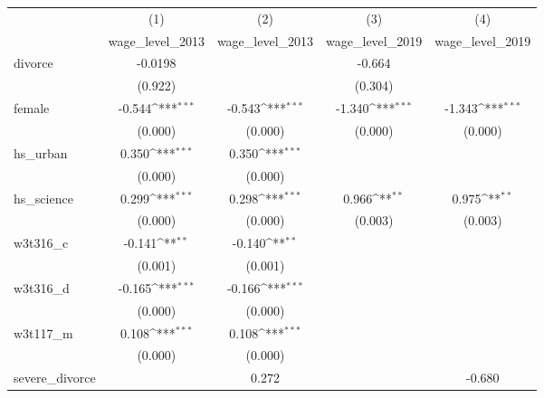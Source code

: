 {
\def\sym#1{\ifmmode^{#1}\else\(^{#1}\)\fi}
\begin{tabular}{l*{4}{c}}
\hline\hline
            &\multicolumn{1}{c}{(1)}&\multicolumn{1}{c}{(2)}&\multicolumn{1}{c}{(3)}&\multicolumn{1}{c}{(4)}\\
            &\multicolumn{1}{c}{wage\_level\_2013}&\multicolumn{1}{c}{wage\_level\_2013}&\multicolumn{1}{c}{wage\_level\_2019}&\multicolumn{1}{c}{wage\_level\_2019}\\
\hline
divorce     &     -0.0198         &                     &      -0.664         &                     \\
            &     (0.922)         &                     &     (0.304)         &                     \\
[1em]
female      &      -0.544\sym{***}&      -0.543\sym{***}&      -1.340\sym{***}&      -1.343\sym{***}\\
            &     (0.000)         &     (0.000)         &     (0.000)         &     (0.000)         \\
[1em]
hs\_urban    &       0.350\sym{***}&       0.350\sym{***}&                     &                     \\
            &     (0.000)         &     (0.000)         &                     &                     \\
[1em]
hs\_science  &       0.299\sym{***}&       0.298\sym{***}&       0.966\sym{**} &       0.975\sym{**} \\
            &     (0.000)         &     (0.000)         &     (0.003)         &     (0.003)         \\
[1em]
w3t316\_c    &      -0.141\sym{**} &      -0.140\sym{**} &                     &                     \\
            &     (0.001)         &     (0.001)         &                     &                     \\
[1em]
w3t316\_d    &      -0.165\sym{***}&      -0.166\sym{***}&                     &                     \\
            &     (0.000)         &     (0.000)         &                     &                     \\
[1em]
w3t117\_m    &       0.108\sym{***}&       0.108\sym{***}&                     &                     \\
            &     (0.000)         &     (0.000)         &                     &                     \\
[1em]
severe\_divorce&                     &       0.272         &                     &      -0.680         \\

\end{tabular}}

